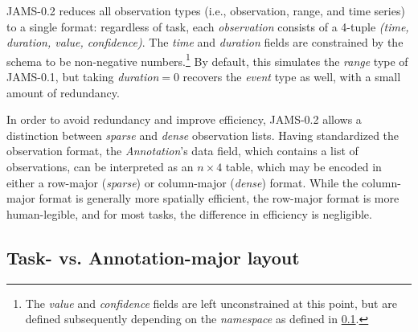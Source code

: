 \documentclass{article}
\begin{document}
JAMS-0.2 reduces all observation types (i.e., observation, range, and time series) to a single format: regardless of task, each \emph{observation} consists of a 4-tuple \emph{(time, duration, value, confidence)}.
The \emph{time} and \emph{duration} fields are constrained by the schema to be non-negative numbers.\footnote{The \emph{value} and
\emph{confidence} fields are left unconstrained at this point, but are defined subsequently depending on the \emph{namespace} as defined in \cref{sec:schema:task}.}
By default, this simulates the \emph{range} type of JAMS-0.1, but taking \emph{duration}$=0$ recovers the \emph{event}
type as well, with a small amount of redundancy.

\sloppy In order to avoid redundancy and improve efficiency, JAMS-0.2 allows a distinction between \emph{sparse} and \emph{dense} observation lists.
Having standardized the observation format, the \emph{Annotation}'s data field, which contains a list of observations, can be interpreted as an $n\times 4$ table, which may be encoded in either a row-major (\emph{sparse}) or column-major (\emph{dense}) format.
While the column-major format is generally more spatially efficient, the row-major format is more human-legible, and for most tasks, the difference in efficiency is negligible.


\subsection{Task- vs. Annotation-major layout}\label{sec:schema:task}
\end{document}
